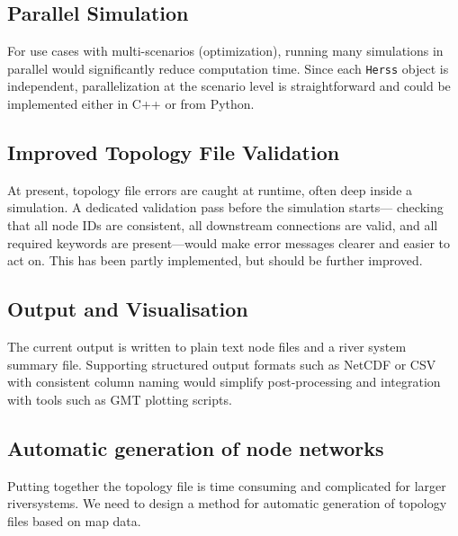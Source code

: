 \documentclass[a4paper, 12pt]{report}
\begin{document}
	\subsection{Parallel Simulation}
	For use cases with multi-scenarios (optimization), running many
	simulations in parallel would significantly reduce computation time.
	Since each \texttt{Herss} object is independent, parallelization
	at the scenario level is straightforward and could be implemented 
	either in C++ or from Python. 

	\subsection{Improved Topology File Validation}
	At present, topology file errors are caught at runtime, often deep inside
	a simulation. A dedicated validation pass before the simulation starts---
	checking that all node IDs are consistent, all downstream connections
	are valid, and all required keywords are present---would make error
	messages clearer and easier to act on. This has been partly implemented, but should be further improved. 

	\subsection{Output and Visualisation}
	The current output is written to plain text node files and a river system
	summary file. Supporting structured output formats such as NetCDF or
	CSV with consistent column naming would simplify post-processing and
	integration with tools such as GMT plotting scripts.
	
	
	\subsection{Automatic generation of node networks}
	Putting together the topology file is time consuming and complicated for larger riversystems. We need to design a method for automatic generation of topology files based on map data. 







\end{document}
